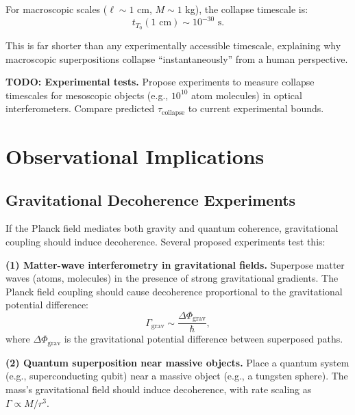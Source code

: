 \documentclass[11pt,a4paper]{article}
\newcommand{\Tzero}{\ensuremath{T_0}}
\theoremstyle{definition}
\theoremstyle{remark}
\begin{document}
For macroscopic scales ($\ell \sim 1$ cm, $M \sim 1$ kg), the collapse timescale is:
\begin{equation}
\label{eq:macroscopic_collapse_time}
t_{\Tzero}(1 \text{ cm}) \sim 10^{-30} \text{ s}.
\end{equation}

This is far shorter than any experimentally accessible timescale, explaining why macroscopic superpositions collapse ``instantaneously'' from a human perspective.

\textbf{TODO: Experimental tests.} Propose experiments to measure collapse timescales for mesoscopic objects (e.g., $10^{10}$ atom molecules) in optical interferometers. Compare predicted $\tau_{\mathrm{collapse}}$ to current experimental bounds.

\section{Observational Implications}
\label{sec:observational}

\subsection{Gravitational Decoherence Experiments}
\label{sec:grav_decoherence_exp}

If the Planck field mediates both gravity and quantum coherence, gravitational coupling should induce decoherence. Several proposed experiments test this:

\textbf{(1) Matter-wave interferometry in gravitational fields.} Superpose matter waves (atoms, molecules) in the presence of strong gravitational gradients. The Planck field coupling should cause decoherence proportional to the gravitational potential difference:
\begin{equation}
\label{eq:grav_decoh_rate}
\Gamma_{\mathrm{grav}} \sim \frac{\Delta \Phi_{\mathrm{grav}}}{\hbar},
\end{equation}
where $\Delta \Phi_{\mathrm{grav}}$ is the gravitational potential difference between superposed paths.

\textbf{(2) Quantum superposition near massive objects.} Place a quantum system (e.g., superconducting qubit) near a massive object (e.g., a tungsten sphere). The mass's gravitational field should induce decoherence, with rate scaling as $\Gamma \propto M/r^3$.
\end{document}
